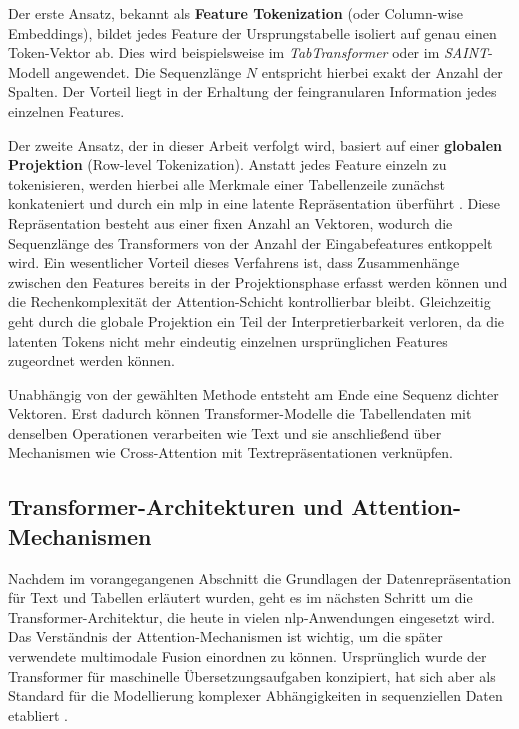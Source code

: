 Der erste Ansatz, bekannt als \textbf{Feature Tokenization} (oder Column-wise Embeddings), bildet jedes Feature der Ursprungstabelle isoliert auf genau einen Token-Vektor ab. Dies wird beispielsweise im \textit{TabTransformer} \cite{Huang2020} oder im \textit{SAINT}-Modell \cite{Somepalli2021} angewendet. Die Sequenzlänge $N$ entspricht hierbei exakt der Anzahl der Spalten. Der Vorteil liegt in der Erhaltung der feingranularen Information jedes einzelnen Features.

Der zweite Ansatz, der in dieser Arbeit verfolgt wird, basiert auf einer \textbf{globalen Projektion} (Row-level Tokenization). Anstatt jedes Feature einzeln zu tokenisieren, werden hierbei alle Merkmale einer Tabellenzeile zunächst konkateniert und durch ein \gls{mlp} in eine latente Repräsentation überführt \cite{Hollmann2023TabPFN}. Diese Repräsentation besteht aus einer fixen Anzahl an Vektoren, wodurch die Sequenzlänge des Transformers von der Anzahl der Eingabefeatures entkoppelt wird. Ein wesentlicher Vorteil dieses Verfahrens ist, dass Zusammenhänge zwischen den Features bereits in der Projektionsphase erfasst werden können und die Rechenkomplexität der Attention-Schicht kontrollierbar bleibt. Gleichzeitig geht durch die globale Projektion ein Teil der Interpretierbarkeit verloren, da die latenten Tokens nicht mehr eindeutig einzelnen ursprünglichen Features zugeordnet werden können.

Unabhängig von der gewählten Methode entsteht am Ende eine Sequenz dichter Vektoren. Erst dadurch können Transformer-Modelle die Tabellendaten mit denselben Operationen verarbeiten wie Text und sie anschließend über Mechanismen wie Cross-Attention mit Textrepräsentationen verknüpfen.

\subsection{Transformer-Architekturen und Attention-Mechanismen}
\label{sec:transformer_attention}

Nachdem im vorangegangenen Abschnitt die Grundlagen der Datenrepräsentation für Text und Tabellen erläutert wurden, geht es im nächsten Schritt um die Transformer-Architektur, die heute in vielen \gls{nlp}-Anwendungen eingesetzt wird. Das Verständnis der Attention-Mechanismen ist wichtig, um die später verwendete multimodale Fusion einordnen zu können. Ursprünglich wurde der Transformer für maschinelle Übersetzungsaufgaben konzipiert, hat sich aber als Standard für die Modellierung komplexer Abhängigkeiten in sequenziellen Daten etabliert \cite{Vaswani2017}.


